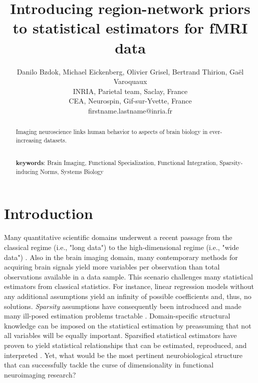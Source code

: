 \documentclass{article} %
\title{Introducing region-network priors
to statistical estimators for fMRI data}
\begin{document}
\author{Danilo Bzdok, Michael Eickenberg, Olivier Grisel,
  Bertrand Thirion,
  Ga\"el Varoquaux\\
  INRIA, Parietal team, Saclay, France\\
  CEA, Neurospin, Gif-sur-Yvette, France\\
  firstname.lastname@inria.fr}

\maketitle

\begin{abstract}
Imaging neuroscience links human behavior to aspects of brain
biology in ever-increasing datasets.



\textbf{\\keywords}: Brain Imaging, Functional Specialization,
Functional Integration,
Sparsity-inducing Norms, Systems Biology

\end{abstract}

\section{Introduction}
%
Many quantitative scientific domains underwent a
recent passage from the classical regime (i.e., "long data")  to
the high-dimensional regime (i.e., "wide data")
\citep{jordan2015massive}.
Also in the brain imaging domain,
many contemporary methods for acquiring brain signals yield
more variables per observation than
total observations available in a data sample.
This scenario challenges many statistical estimators from
classical statistics.
For instance,
linear regression models without any additional assumptions
yield an infinity of possible coefficients
and, thus, no solutions.
%
\textit{Sparsity} assumptions have consequently been
introduced and made many ill-posed estimation problems tractable
\cite{hastie2015statistical}.
Domain-specific structural knowledge can be imposed on the 
statistical estimation by preassuming that not all variables will be
equally important.
Sparsified statistical estimators have proven to yield
statistical relationships that can be
estimated, reproduced, and interpreted
\cite{giraud2014introduction}.
%
Yet, what would be the most pertinent neurobiological structure
that can successfully tackle the curse of dimensionality in
functional neuroimaging research?
\end{document}
